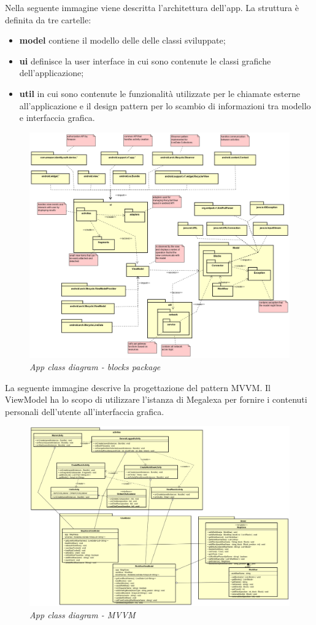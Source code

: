 Nella seguente immagine viene descritta l'architettura dell'app.
La struttura è definita da tre cartelle:
\begin{itemize}
	\item \textbf{model} contiene il modello delle delle classi sviluppate;
	\item \textbf{ui} definisce la user interface in cui sono contenute le classi grafiche dell'applicazione;
	\item \textbf{util} in cui sono contenute le funzionalità utilizzate per le chiamate esterne all'applicazione e il design pattern per lo scambio di informazioni tra modello e interfaccia grafica.

\end{itemize}
\begin{figure} [H]
	\centering
	\includegraphics[scale=0.3]{./images/Package.png}
	\caption{\textit{App class diagram - blocks package}}\label{Package}
\end{figure}
\newpage
La seguente immagine descrive la progettazione del pattern MVVM.
Il ViewModel ha lo scopo di utilizzare l'istanza di Megalexa per fornire i contenuti personali dell'utente all'interfaccia grafica.
\begin{figure} [H]
	\centering
	\includegraphics[scale=0.27]{./images/MVVM.png}
	\caption{\textit{App class diagram - MVVM}}\label{MVVM}
\end{figure}
